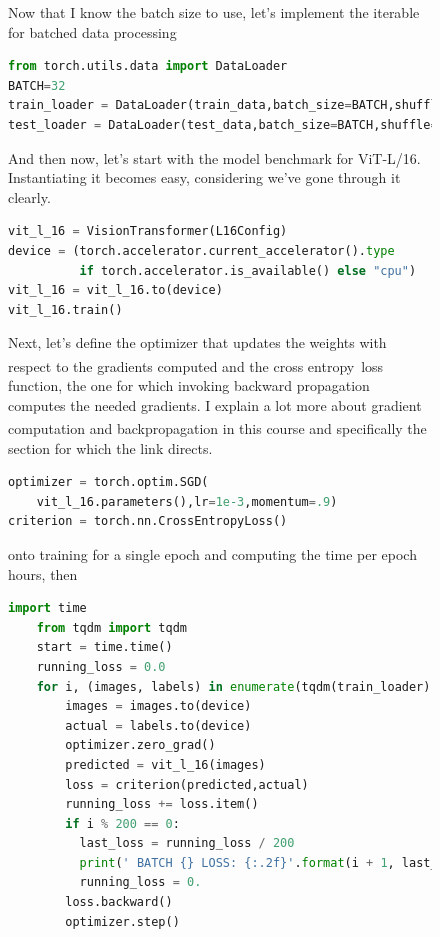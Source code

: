 \documentclass[12pt]{article}
\newcommand{\sidecite}[1]{\textsuperscript{\textcolor{blue}{\textbf{\scriptsize#1}}}}
\newcommand{\maincitecount}{\sidecite{\stepcounter{maincite}\themaincite}}
\begin{document}
\begin{figure}[!htb]
    \begin{minipage}[t]{0.65\textwidth}
    \raggedright
    Now that I know the batch size to use, let's implement the iterable for batched data 
    processing 
\begin{lstlisting}[language=python,style=python,basicstyle=\ttfamily\scriptsize]
from torch.utils.data import DataLoader
BATCH=32
train_loader = DataLoader(train_data,batch_size=BATCH,shuffle=True)
test_loader = DataLoader(test_data,batch_size=BATCH,shuffle=True)
\end{lstlisting}
And then now, let's start with the model benchmark for {ViT-L/16}. Instantiating it becomes 
easy, considering we've gone through it clearly.
\begin{lstlisting}[language=python,style=python,basicstyle=\ttfamily\scriptsize]
vit_l_16 = VisionTransformer(L16Config)
device = (torch.accelerator.current_accelerator().type 
          if torch.accelerator.is_available() else "cpu")
vit_l_16 = vit_l_16.to(device)
vit_l_16.train()
\end{lstlisting}
Next, let's define the optimizer that updates the weights with respect to the gradients computed and 
the cross entropy\maincitecount\ loss function, the one for which invoking backward propagation 
computes the needed gradients. I explain a lot more about gradient computation and backpropagation in 
this course \maincitecount and specifically the section for which the link directs. 
\begin{lstlisting}[language=python,style=python,basicstyle=\ttfamily\scriptsize]
optimizer = torch.optim.SGD(
    vit_l_16.parameters(),lr=1e-3,momentum=.9)
criterion = torch.nn.CrossEntropyLoss()    
\end{lstlisting}
onto training for a single epoch and computing the time per epoch hours, then
\begin{lstlisting}[language=python,style=python,basicstyle=\ttfamily\scriptsize]
    import time
    from tqdm import tqdm 
    start = time.time()
    running_loss = 0.0
    for i, (images, labels) in enumerate(tqdm(train_loader)):
        images = images.to(device)
        actual = labels.to(device)
        optimizer.zero_grad()
        predicted = vit_l_16(images)
        loss = criterion(predicted,actual)
        running_loss += loss.item()
        if i % 200 == 0:
          last_loss = running_loss / 200
          print(' BATCH {} LOSS: {:.2f}'.format(i + 1, last_loss))
          running_loss = 0.
        loss.backward()
        optimizer.step()

\end{lstlisting}
\end{minipage}
\end{figure}
\end{document}
